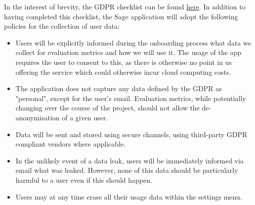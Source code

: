 In the interest of brevity, the GDPR checklist can be found \href{https://gdpr.eu/checklist/}{here}. In addition to having completed this checklist, the Sage application will adopt the following policies for the collection of user data:

\begin{itemize}
    \item Users will be explicitly informed during the onboarding process what data we collect for evaluation metrics and how we will use it. The usage of the app requires the user to consent to this, as there is otherwise no point in us offering the service which could otherwise incur cloud computing costs.
    \item The application does not capture any data defined by the GDPR as "personal", except for the user's email. Evaluation metrics, while potentially changing over the course of the project, should not allow the de-anonymisation of a given user.
    \item Data will be sent and stored using secure channels, using third-party GDPR compliant vendors where applicable.
    \item In the unlikely event of a data leak, users will be immediately informed via email what was leaked. However, none of this data should be particularly harmful to a user even if this should happen.
    \item Users may at any time erase all their usage data within the settings menu.
\end{itemize}